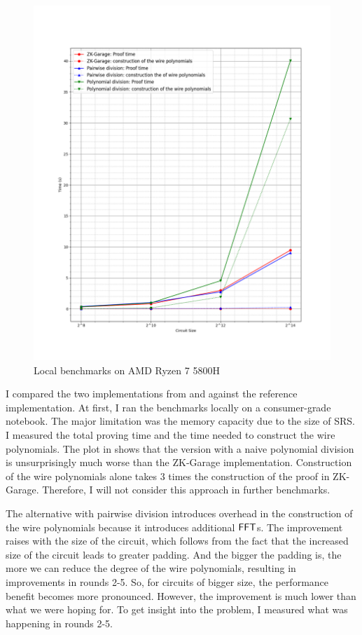 \begin{figure}
    \centering
    \includegraphics[width=1\linewidth]{figures/optimizations/local_bench.png}
    \caption{Local benchmarks on AMD Ryzen 7 5800H}
    \label{fig:local-bench}
\end{figure}

I compared the two implementations from  and  against the reference implementation. At first, I ran the benchmarks locally on a consumer-grade notebook. The major limitation was the memory capacity due to the size of SRS. I measured the total proving time and the time needed to construct the wire polynomials. The plot in  shows that the version with a naive polynomial division is unsurprisingly much worse than the ZK-Garage implementation. Construction of the wire polynomials alone takes 3 times the construction of the proof in ZK-Garage. Therefore, I will not consider this approach in further benchmarks. 

The alternative with pairwise division  introduces overhead in the construction of the wire polynomials because it introduces additional $\mathsf{FFT}$s. The improvement raises with the size of the circuit, which follows from the fact that the increased size of the circuit leads to greater padding. And the bigger the padding is, the more we can reduce the degree of the wire polynomials, resulting in improvements in rounds 2-5. So, for circuits of bigger size, the performance benefit becomes more pronounced. However, the improvement is much lower than what we were hoping for. To get insight into the problem, I measured what was happening in rounds 2-5. 

